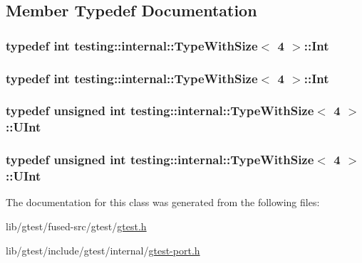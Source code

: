 \subsection{Member Typedef Documentation}
\hypertarget{classtesting_1_1internal_1_1_type_with_size_3_014_01_4_a80351860c00ed665e73f952143f4484a}{
\subsubsection[{Int}]{\setlength{\rightskip}{0pt plus 5cm}typedef int {\bf testing\-::internal\-::\-Type\-With\-Size}$<$ 4 $>$\-::{\bf Int}}}\label{classtesting_1_1internal_1_1_type_with_size_3_014_01_4_a80351860c00ed665e73f952143f4484a}
\hypertarget{classtesting_1_1internal_1_1_type_with_size_3_014_01_4_a80351860c00ed665e73f952143f4484a}{
\subsubsection[{Int}]{\setlength{\rightskip}{0pt plus 5cm}typedef int {\bf testing\-::internal\-::\-Type\-With\-Size}$<$ 4 $>$\-::{\bf Int}}}\label{classtesting_1_1internal_1_1_type_with_size_3_014_01_4_a80351860c00ed665e73f952143f4484a}
\hypertarget{classtesting_1_1internal_1_1_type_with_size_3_014_01_4_a7d559570f830bf35d095eeb94d98de58}{
\subsubsection[{U\-Int}]{\setlength{\rightskip}{0pt plus 5cm}typedef unsigned int {\bf testing\-::internal\-::\-Type\-With\-Size}$<$ 4 $>$\-::{\bf U\-Int}}}\label{classtesting_1_1internal_1_1_type_with_size_3_014_01_4_a7d559570f830bf35d095eeb94d98de58}
\hypertarget{classtesting_1_1internal_1_1_type_with_size_3_014_01_4_a7d559570f830bf35d095eeb94d98de58}{
\subsubsection[{U\-Int}]{\setlength{\rightskip}{0pt plus 5cm}typedef unsigned int {\bf testing\-::internal\-::\-Type\-With\-Size}$<$ 4 $>$\-::{\bf U\-Int}}}\label{classtesting_1_1internal_1_1_type_with_size_3_014_01_4_a7d559570f830bf35d095eeb94d98de58}


The documentation for this class was generated from the following files\-:\begin{DoxyCompactItemize}
\item 
lib/gtest/fused-\/src/gtest/\hyperlink{fused-src_2gtest_2gtest_8h}{gtest.\-h}\item 
lib/gtest/include/gtest/internal/\hyperlink{gtest-port_8h}{gtest-\/port.\-h}\end{DoxyCompactItemize}
